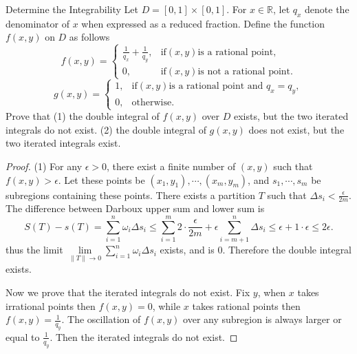 \begin{example}{Determine the Integrability}{}
  Let $D = [0, 1]\times [0,1]$. For $x \in \mathbb{R}$,
  let $q_x$ denote the denominator of $x$ when expressed as a reduced fraction.
  Define the function $f(x,y)$ on $D$ as follows
  \begin{equation}
    f(x,y)=\begin{cases}
      \frac{1}{q_x}+\frac{1}{q_y},&\mathrm{if}\left(x,y\right)\text{is a rational point},\\
      0,&\mathrm{if}\left(x,y\right)\text{is not a rational point}.
    \end{cases}
  \end{equation}
  \begin{equation}
    g(x,y)=\begin{cases}
      1,&\mathrm{if}(x,y)\text{is a rational point and }q_x=q_y,\\
      0,&\text{otherwise.}
    \end{cases}
  \end{equation}
  Prove that (1) the double integral of $f(x,y)$ over $D$ exists, but the two
  iterated integrals do not exist.
  (2) the double integral of $g(x,y)$ does not exist, but the two iterated
  integrals exist.
\end{example}

\begin{proof}
  (1) For any $\epsilon > 0$, there exist a finite number of $(x, y)$
  such that $f(x,y) > \epsilon$.
  Let these points be $(x_1, y_1),\cdots,(x_m, y_m)$,
  and $s_1,\cdots,s_m$ be subregions containing these points.
  There exists a partition $T$ such that $\Delta s_i < \frac{\epsilon}{2m}$.
  The difference between Darboux upper sum and lower sum is
  \begin{equation}
    S(T) - s(T) = \sum\limits_{i = 1}^n \omega_i \Delta s_i
    \leq \sum\limits_{i = 1}^m 2 \cdot \frac{\epsilon}{2m} +  \epsilon \sum\limits_{i = m+1}^n \Delta s_i
    \leq \epsilon + 1 \cdot \epsilon
    \leq 2 \epsilon.
  \end{equation}
  thus the limit $\lim \limits _{\|T\| \rightarrow 0} \sum\limits_{i = 1}^n
  \omega_i \Delta s_i$ exists, and is $0$. Therefore the double integral exists.

  Now we prove that the iterated integrals do not exist.
  Fix $y$, when $x$ takes irrational points then $f(x,y) = 0$,
  while $x$ takes rational points then $f(x,y)=\frac{1}{q_y}$.
  The oscillation of $f(x,y)$ over any subregion is always larger or equal to $\frac{1}{q_y}$.
  Then the iterated integrals do not exist.
\end{proof}

